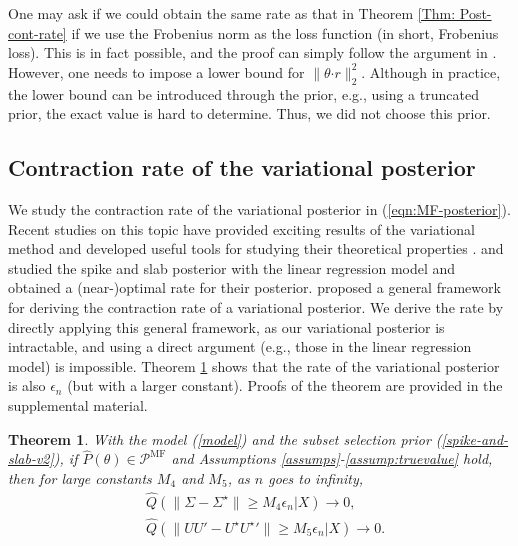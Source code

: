 \documentclass[pdftex, noinfoline, letter]{imsart}
\DeclareMathOperator{\MF}{\text{MF}}
\theoremstyle{plain}
\newtheorem{theorem}{Theorem}[section]
\begin{document}
One may ask if we could obtain the same rate as that in Theorem \ref{Thm: Post-cont-rate} if we use the Frobenius norm as the loss function (in short, Frobenius loss). This is in fact possible, and the proof can simply follow the argument in \citet{gao15}. However, one needs to impose a lower bound for $\|\theta{\cdot r}\|_2^2$. Although in practice, the lower bound can be introduced through the prior, e.g., using a truncated prior, the exact value is hard to determine. Thus, we did not choose this prior.



\subsection{Contraction rate of the variational posterior}

We study the contraction rate of the variational posterior in (\ref{eqn:MF-posterior}). Recent studies on this topic have provided exciting results of the variational method and developed useful tools for studying their theoretical properties \citep[e.g.][]{ray20, wang19, yang20, zhang20}. 
\citet{ray20} and \citet{yang20} studied the spike and slab posterior with the linear regression model and obtained a (near-)optimal rate for their posterior. \citet{zhang20} proposed a general framework for deriving the contraction rate of a variational posterior. We derive the rate by directly applying this general framework, as our variational posterior is intractable, and using a direct argument (e.g., those in the linear regression model) is impossible. Theorem \ref{Thm: variational-post-contr-rate} shows that the rate of the variational posterior is also $\epsilon_n$ (but with a larger constant). Proofs of the theorem are provided in the supplemental material. \\

\begin{theorem}
\label{Thm: variational-post-contr-rate}
With the model (\ref{model}) and the subset selection prior (\ref{spike-and-slab-v2}), if $\widehat  P(\theta) \in \mathcal{P}^{\MF}$ and Assumptions \ref{assumps}-\ref{assump:truevalue} hold, then for large constants $M_4$ and $M_5$, as $n$ goes to infinity,
\begin{align}
    & \widehat {Q}(\|\Sigma - \Sigma^\star\| \geq M_4\epsilon_n|X) \to 0,
    \label{thm5.1-1}\\
    & \widehat {Q}(\|UU' - U^\star{U^\star}'\| \geq M_5 \epsilon_n|X) \to 0.
    \label{thm5.1-2}
\end{align}
\end{theorem}
\end{document}
